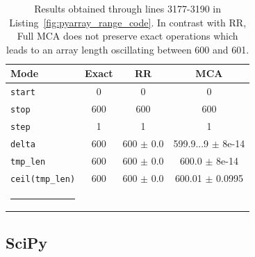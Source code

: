 \documentclass[10pt,journal,compsoc]{IEEEtran}
\makeatletter
\newcommand{\thickhline}{%
    \noalign {\ifnum 0=`}\fi \hrule height 1pt
    \futurelet \reserved@a \@xhline
}
\makeatother
\begin{document}
\begin{table}[t]
    \centering
    \begin{tabular}{l|ccc}
        \hline                                                   
        \textbf{Mode}           & Exact & RR            & MCA                   \\
        \hline
        \texttt{start}          & 0     & 0             & 0                     \\
        \texttt{stop}           & 600   & 600           & 600                   \\
        \texttt{step}           & 1     & 1             & 1                     \\ 
        \texttt{delta}          & 600   & 600 $\pm$ 0.0 & 599.9...9 $\pm$ 8e-14 \\
        \texttt{tmp\_len}       & 600   & 600 $\pm$ 0.0 & 600.0 $\pm$ 8e-14     \\
        \texttt{ceil(tmp\_len)} & 600   & 600 $\pm$ 0.0 & 600.01 $\pm$ 0.0995   \\
        \thickhline        
    \end{tabular}
    \caption{Results obtained through lines 3177-3190 in Listing~\ref{fig:pyarray_range_code}. In contrast with RR, Full MCA does not preserve exact operations which leads to an array length oscillating between 600 and 601.}
    \label{tab:mca_result_linspace}
\end{table}

\subsection{SciPy}
\label{sec:scipy_tests}
\end{document}
